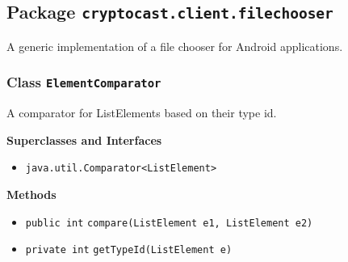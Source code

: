 \subsection{Package \lstinline!cryptocast.client.filechooser!}
A generic implementation of a file chooser for Android applications.

\subsubsection{Class \lstinline|ElementComparator|}
A comparator for ListElements based on their type id. \\
\noindent\begin{minipage}[t]{5cm}
\vspace{0.3em}
\hspace*{2em}
\vspace{0.3em}
\end{minipage}



\textbf{\sffamily Superclasses and Interfaces}
\begin{itemize}
\item \lstinline|java.util.Comparator<ListElement>|
\end{itemize}



\textbf{\sffamily Methods}
\begin{itemize}
\item \lstinline|public int| \lstinline|compare|\lstinline|(ListElement e1, ListElement e2)| \\[-0.6em]




\item \lstinline|private int| \lstinline|getTypeId|\lstinline|(ListElement e)| \\[-0.6em]




\end{itemize}

